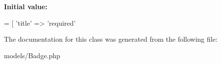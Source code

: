 {\bfseries Initial value\-:}
\begin{DoxyCode}
= [ 
        \textcolor{stringliteral}{'title'} => \textcolor{stringliteral}{'required'}
\end{DoxyCode}


The documentation for this class was generated from the following file\-:\begin{DoxyCompactItemize}
\item 
models/Badge.\-php\end{DoxyCompactItemize}
